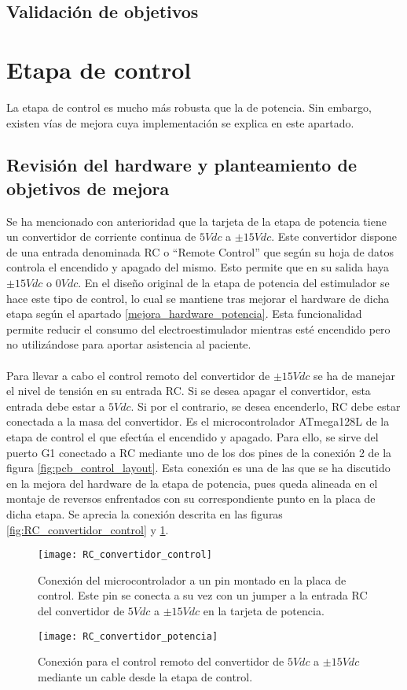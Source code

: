 \subsection{Validación de objetivos}


\section{Etapa de control}
La etapa de control es mucho más robusta que la de potencia. Sin embargo, existen vías de mejora cuya implementación se explica en este apartado.

\subsection{Revisión del hardware y planteamiento de objetivos de mejora}
Se ha mencionado con anterioridad que la tarjeta de la etapa de potencia tiene un convertidor de corriente continua de $5Vdc$ a $\pm15Vdc$. Este convertidor dispone de una entrada denominada RC o ``Remote Control'' que según su hoja de datos controla el encendido y apagado del mismo. Esto permite que en su salida haya $\pm15Vdc$ o $0Vdc$. En el diseño original de la etapa de potencia del estimulador se hace este tipo de control, lo cual se mantiene tras mejorar el hardware de dicha etapa según el apartado \ref{mejora_hardware_potencia}. Esta funcionalidad permite reducir el consumo del electroestimulador mientras esté encendido pero no utilizándose para aportar asistencia al paciente.
\\
\\
Para llevar a cabo el control remoto del convertidor de $\pm15Vdc$ se ha de manejar el nivel de tensión en su entrada RC. Si se desea apagar el convertidor, esta entrada debe estar a $5Vdc$. Si por el contrario, se desea encenderlo, RC debe estar conectada a la masa del convertidor. Es el microcontrolador ATmega128L de la etapa de control el que efectúa el encendido y apagado. Para ello, se sirve del puerto G1 conectado a RC mediante uno de los dos pines de la conexión 2 de la figura \ref{fig:pcb_control_layout}. Esta conexión es una de las que se ha discutido en la mejora del hardware de la etapa de potencia, pues queda alineada en el montaje de reversos enfrentados con su correspondiente punto en la placa de dicha etapa. Se aprecia la conexión descrita en las figuras \ref{fig:RC_convertidor_control} y \ref{fig:RC_convertidor_potencia}.\\

\begin{figure}[!htb]
  \texttt{[image: RC\_convertidor\_control]}
  \caption{Conexión del microcontrolador a un pin montado en la placa de control. Este pin se conecta a su vez con un jumper a la entrada RC del convertidor de $5Vdc$ a $\pm15Vdc$ en la tarjeta de potencia.}\label{fig:RC_convertidor_control}
\endminipage\hfill
{}
  \texttt{[image: RC\_convertidor\_potencia]}
  \caption{Conexión para el control remoto del convertidor de $5Vdc$ a $\pm15Vdc$ mediante un cable desde la etapa de control.}\label{fig:RC_convertidor_potencia}
\endminipage\hfill
\end{figure}

